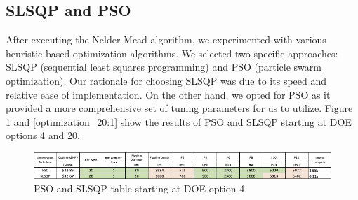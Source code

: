 \documentclass[balance,upint,subscriptcorrection,varvw,mathalfa=cal=boondoxo,spanish,french,vietnamese,russian,greek,pdf-a,colorlinks]{asmeconf}
\begin{document}
\begin{table}[btp]
\caption[Table]{Nelder-Mead Convergence and NPV}\label{nelder_convergence:1}
\end{table}


\subsection{SLSQP and PSO}
After executing the Nelder-Mead algorithm, we experimented with various heuristic-based optimization algorithms. We selected two specific approaches: SLSQP (sequential least squares programming) and PSO (particle swarm optimization). Our rationale for choosing SLSQP was due to its speed and relative ease of implementation. On the other hand, we opted for PSO as it provided a more comprehensive set of tuning parameters for us to utilize. Figure \ref{optimization_4:1} and \ref{optimization_20:1} show the results of PSO and SLSQP starting at DOE options 4 and 20. 



\begin{figure}[btp]
\centering\includegraphics[width=0.7\linewidth]{images/optimization_point_4.jpg}
\caption{PSO and SLSQP table starting at DOE option 4}\label{optimization_4:1}
\end{figure}
 

\end{document}
